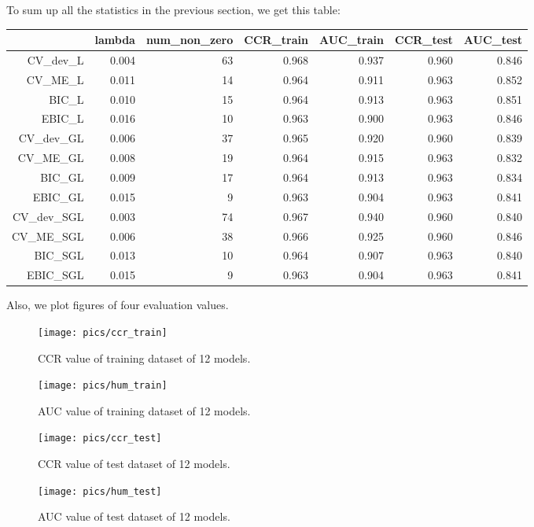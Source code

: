 \documentclass[]{article}
\begin{document}
To sum up all the statistics in the previous section, we get this table:
\begin{table}[ht]
	\centering
	\begin{tabular}{rrrrrrr}
		\hline
		& lambda & num\_non\_zero & CCR\_train & AUC\_train & CCR\_test & AUC\_test \\ 
		\hline
		CV\_dev\_L & 0.004 &   63 & 0.968 & 0.937 & 0.960 & 0.846 \\ 
		CV\_ME\_L & 0.011 &   14 & 0.964 & 0.911 & 0.963 & 0.852 \\ 
		BIC\_L & 0.010 &   15 & 0.964 & 0.913 & 0.963 & 0.851 \\ 
		EBIC\_L & 0.016 &   10 & 0.963 & 0.900 & 0.963 & 0.846 \\ 
		CV\_dev\_GL & 0.006 &   37 & 0.965 & 0.920 & 0.960 & 0.839 \\ 
		CV\_ME\_GL & 0.008 &   19 & 0.964 & 0.915 & 0.963 & 0.832 \\ 
		BIC\_GL & 0.009 &   17 & 0.964 & 0.913 & 0.963 & 0.834 \\ 
		EBIC\_GL & 0.015 &    9 & 0.963 & 0.904 & 0.963 & 0.841 \\ 
		CV\_dev\_SGL & 0.003 &   74 & 0.967 & 0.940 & 0.960 & 0.840 \\ 
		CV\_ME\_SGL & 0.006 &   38 & 0.966 & 0.925 & 0.960 & 0.846 \\ 
		BIC\_SGL & 0.013 &   10 & 0.964 & 0.907 & 0.963 & 0.840 \\ 
		EBIC\_SGL & 0.015 &    9 & 0.963 & 0.904 & 0.963 & 0.841 \\ 
		\hline
	\end{tabular}
\end{table}

Also, we plot figures of four evaluation values.
\begin{figure}[H]
	\centering
	\texttt{[image: pics/ccr\_train]}
	\caption{CCR value of training dataset of 12 models.}
\end{figure}
\begin{figure}[H]
	\centering
	\texttt{[image: pics/hum\_train]}
	\caption{AUC value of training dataset of 12 models.}
\end{figure}
\begin{figure}[H]
	\centering
	\texttt{[image: pics/ccr\_test]}
	\caption{CCR value of test dataset of 12 models.}
\end{figure}
\begin{figure}[H]
	\centering
	\texttt{[image: pics/hum\_test]}
	\caption{AUC value of test dataset of 12 models.}
\end{figure}
\end{document}
